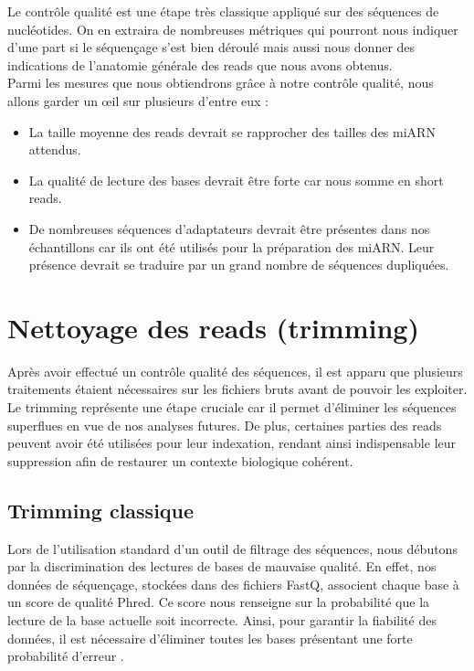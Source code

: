 Le contrôle qualité est une étape très classique appliqué sur des séquences de nucléotides. On en extraira de nombreuses métriques qui pourront nous indiquer d’une part si le séquençage s’est bien déroulé mais aussi nous donner des indications de l’anatomie générale des reads que nous avons obtenus. \\

\noindent Parmi les mesures que nous obtiendrons grâce à notre contrôle qualité, nous allons garder un œil sur plusieurs d’entre eux :
\begin{itemize}
    \item  La taille moyenne des reads devrait se rapprocher des tailles des miARN attendus. 
    \item La qualité de lecture des bases devrait être forte car nous somme en short reads. 
    \item De nombreuses séquences d’adaptateurs devrait être présentes dans nos échantillons car ils ont été utilisés pour la préparation des miARN. Leur présence devrait se traduire par un grand nombre de séquences dupliquées. 
\end{itemize}


\section{Nettoyage des reads (trimming)}
Après avoir effectué un contrôle qualité des séquences, il est apparu que plusieurs traitements étaient nécessaires sur les fichiers bruts avant de pouvoir les exploiter. Le trimming représente une étape cruciale car il permet d'éliminer les séquences superflues en vue de nos analyses futures. De plus, certaines parties des reads peuvent avoir été utilisées pour leur indexation, rendant ainsi indispensable leur suppression afin de restaurer un contexte biologique cohérent.


\subsection*{Trimming classique}
Lors de l'utilisation standard d'un outil de filtrage des séquences, nous débutons par la discrimination des lectures de bases de mauvaise qualité. En effet, nos données de séquençage, stockées dans des fichiers FastQ, associent chaque base à un score de qualité Phred. Ce score nous renseigne sur la probabilité que la lecture de la base actuelle soit incorrecte. Ainsi, pour garantir la fiabilité des données, il est nécessaire d'éliminer toutes les bases présentant une forte probabilité d'erreur \cite{phread}.\\


